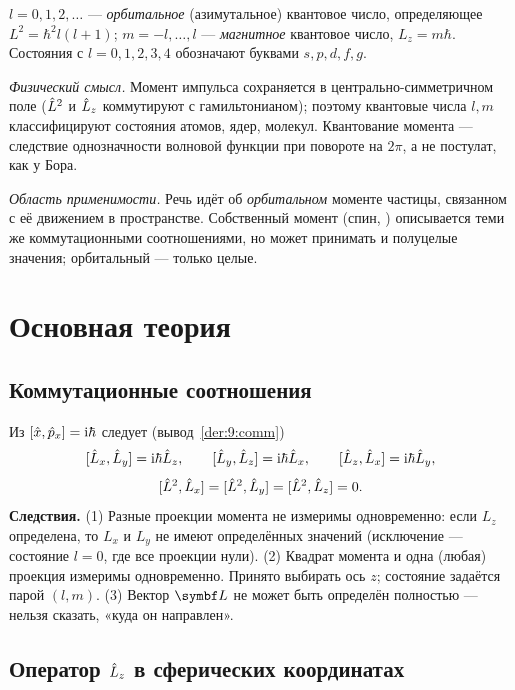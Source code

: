 \begin{definition}
$l=0,1,2,\dots$ — \emph{орбитальное} (азимутальное) квантовое число, определяющее $L^2=\hbar^2l(l+1)$;
$m=-l,\dots,l$ — \emph{магнитное} квантовое число, $L_z=m\hbar$. Состояния с $l=0,1,2,3,4$
обозначают буквами $s,p,d,f,g$.
\end{definition}

\emph{Физический смысл.} Момент импульса сохраняется в центрально-симметричном поле
($\hat{L}^2$ и $\hat{L}_z$ коммутируют с гамильтонианом); поэтому квантовые числа $l,m$ классифицируют
состояния атомов, ядер, молекул. Квантование момента — следствие однозначности волновой функции
при повороте на $2\pi$, а не постулат, как у Бора.

\emph{Область применимости.} Речь идёт об \emph{орбитальном} моменте частицы, связанном с её
движением в пространстве. Собственный момент (спин, ) описывается теми же коммутационными
соотношениями, но может принимать и полуцелые значения; орбитальный — только целые.

\section{Основная теория}

\subsection{Коммутационные соотношения}

Из $[\hat{x},\hat{p}_x]=\mathrm{i}\hbar$ следует (вывод~\ref{der:9:comm})
\begin{equation}\label{eq:9:comm}
  [\hat{L}_x,\hat{L}_y]=\mathrm{i}\hbar\hat{L}_z,\qquad [\hat{L}_y,\hat{L}_z]=\mathrm{i}\hbar\hat{L}_x,\qquad [\hat{L}_z,\hat{L}_x]=\mathrm{i}\hbar\hat{L}_y,
\end{equation}
\begin{equation}\label{eq:9:L2comm}
  [\hat{L}^2,\hat{L}_x]=[\hat{L}^2,\hat{L}_y]=[\hat{L}^2,\hat{L}_z]=0 .
\end{equation}
\textbf{Следствия.} (1) Разные проекции момента не измеримы одновременно: если $L_z$ определена,
то $L_x$ и $L_y$ не имеют определённых значений (исключение — состояние $l=0$, где все проекции нули).
(2) Квадрат момента и одна (любая) проекция измеримы одновременно. Принято выбирать ось $z$;
состояние задаётся парой $(l,m)$. (3) Вектор $\vect L$ не может быть определён полностью — нельзя
сказать, «куда он направлен».

\subsection{Оператор $\hat{L}_z$ в сферических координатах}

